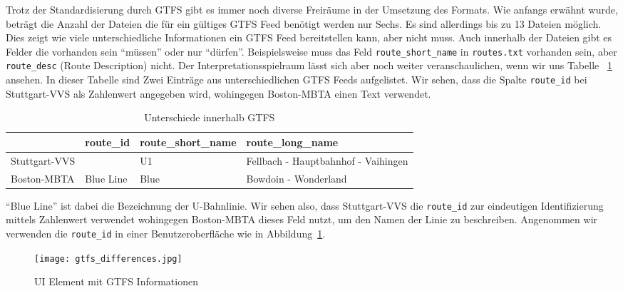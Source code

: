 \begin{newpage}
    Trotz der Standardisierung durch GTFS gibt es immer noch diverse Freiräume in der Umsetzung des Formats. Wie anfangs erwähnt wurde, beträgt die Anzahl der Dateien die für ein gültiges GTFS Feed benötigt werden nur Sechs. Es sind allerdings bis zu 13 Dateien möglich. Dies zeigt wie viele unterschiedliche Informationen ein GTFS Feed bereitstellen kann, aber nicht muss. 
    Auch innerhalb der Dateien gibt es Felder die vorhanden sein "`müssen"' oder nur "`dürfen"'. Beispielsweise muss das Feld \texttt{route\_short\_name} in \texttt{routes.txt} vorhanden sein, aber \texttt{route\_desc} (Route Description) nicht. Der Interpretationsspielraum lässt sich aber noch weiter veranschaulichen, wenn wir uns Tabelle ~\ref{table:gtfs_differences} ansehen. In dieser Tabelle sind Zwei Einträge aus unterschiedlichen GTFS Feeds aufgelistet.
    Wir sehen, dass die Spalte \texttt{route\_id} bei Stuttgart-VVS als Zahlenwert angegeben wird, wohingegen Boston-MBTA einen Text verwendet.

    \begin{longtable}{|>{\raggedright \arraybackslash}p{3.0cm}|>{\raggedright \arraybackslash}p{2.0cm}|>{\raggedright \arraybackslash}p{3.5cm}|>{\raggedright \arraybackslash}p{5.5cm}|}
    \caption{Unterschiede innerhalb GTFS} 
    \label{table:gtfs_differences}\\
      \hline
       & route\_id & route\_short\_name & route\_long\_name\\
      \hline
      Stuttgart-VVS & 379 & U1 & Fellbach - Hauptbahnhof - Vaihingen\\
      \hline
      Boston-MBTA & Blue Line & Blue & Bowdoin - Wonderland\\
      \hline
    \end{longtable}

    "`Blue Line"' ist dabei die Bezeichnung der U-Bahnlinie\parencite{wiki_blue_line}. Wir sehen also, dass Stuttgart-VVS die \texttt{route\_id} zur eindeutigen Identifizierung mittels Zahlenwert verwendet wohingegen Boston-MBTA dieses Feld nutzt, um den Namen der Linie zu beschreiben. Angenommen wir verwenden die \texttt{route\_id} in einer Benutzeroberfläche wie in Abbildung~\ref{fig:gtfs_differences}.

    \begin{figure}[htbp]
      \begin{center}
        \texttt{[image: gtfs\_differences.jpg]}
        \caption{UI Element mit GTFS Informationen}
        \label{fig:gtfs_differences}
      \end{center}
    \end{figure}


\end{newpage}
